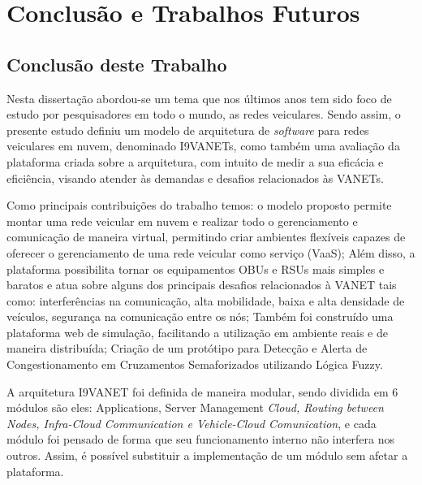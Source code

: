\documentclass[
	12pt,				%
	oneside,			%
	a4paper,			%
	english,			%
	brazil				%
	]{abntex2ppgsi}
\begin{document}
\chapter{Conclusão e Trabalhos Futuros}\label{sec:conclusao}


\section{Conclusão deste Trabalho}

Nesta dissertação abordou-se um tema que nos últimos anos tem sido foco de estudo por pesquisadores em todo o mundo, as redes veiculares. Sendo assim, o presente estudo definiu um modelo de  arquitetura de \textit{software} para redes veiculares em nuvem, denominado I9VANETs, como também uma avaliação da plataforma criada sobre a arquitetura, com intuito de medir a sua eficácia e eficiência, visando atender às demandas e desafios relacionados às VANETs. 


Como principais contribuições do trabalho temos: o modelo proposto permite montar uma rede veicular em nuvem e realizar todo o gerenciamento e comunicação de maneira virtual, permitindo criar ambientes flexíveis capazes de oferecer o gerenciamento de uma rede veicular como serviço (VaaS); Além disso, a plataforma possibilita tornar os equipamentos OBUs e RSUs mais simples e baratos e atua sobre alguns dos principais desafios relacionados à VANET tais como: interferências na comunicação, alta mobilidade, baixa e alta densidade de veículos, segurança na comunicação entre os nós; Também foi construído uma plataforma web de simulação, facilitando a utilização em ambiente reais e de maneira distribuída; Criação de um protótipo para Detecção e Alerta de Congestionamento em Cruzamentos Semaforizados utilizando Lógica Fuzzy.


A arquitetura I9VANET foi definida de maneira modular, sendo dividida em 6 módulos são eles: Applications, Server Management \textit{Cloud, Routing between Nodes, Infra-Cloud Communication e Vehicle-Cloud Comunication}, e cada módulo foi pensado de forma que seu funcionamento interno não interfera nos outros. Assim, é possível substituir a implementação de um módulo sem afetar a plataforma.
\end{document}
